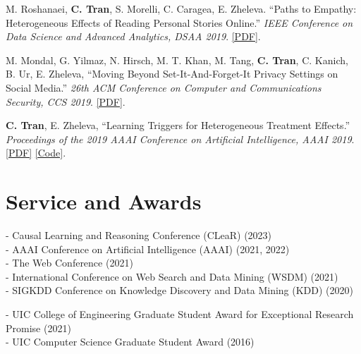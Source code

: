 \documentclass[mm]{simple_style}
\begin{document}
\begin{resume}
	M. Roshanaei, \textbf{C. Tran}, S. Morelli, C. Caragea, E. Zheleva. ``Paths to Empathy: Heterogeneous Effects of Reading Personal Stories Online.'' \textit{IEEE Conference on Data Science and Advanced Analytics, \textcolor{dorange}{DSAA 2019}}. \href{https://www.cs.uic.edu/~ctran/docs/roshanaei-dsaa2019.pdf}{[PDF]}.
	
	M. Mondal, G. Yilmaz, N. Hirsch, M. T. Khan, M. Tang, \textbf{C. Tran}, C. Kanich, B. Ur, E. Zheleva, ``Moving Beyond Set-It-And-Forget-It Privacy Settings on Social Media.'' \textit{26th ACM Conference on Computer and Communications Security, \textcolor{dorange}{CCS 2019}}. \href{https://www.cs.uic.edu/~ctran/docs/mondal-ccs2019.pdf}{[PDF]}.
	
	\textbf{C. Tran}, E. Zheleva, ``Learning Triggers for Heterogeneous Treatment Effects.'' \textit{Proceedings of the 2019 AAAI Conference on Artificial Intelligence, \textcolor{dorange}{AAAI 2019}}. \href{https://arxiv.org/pdf/1902.00087.pdf}{[PDF]} \href{https://github.com/edgeslab/CTL}{[Code]}.
	
	\vspace{-2ex}
	\sectionline
	
	
	
	\section{Service and Awards}
	
	
	
	
	- Causal Learning and Reasoning Conference (CLeaR) (2023)
	\\
	- AAAI Conference on Artificial Intelligence (AAAI) (2021, 2022)
	\\
	- The Web Conference (2021)
	\\
	- International Conference on Web Search and Data Mining (WSDM) (2021)
	\\
	- SIGKDD Conference on Knowledge Discovery and Data Mining (KDD) (2020)
	
	
	- UIC College of Engineering Graduate Student Award for Exceptional Research Promise (2021)
	\\
	- UIC Computer Science Graduate Student Award (2016)
	
	
\end{resume}
\end{document}
